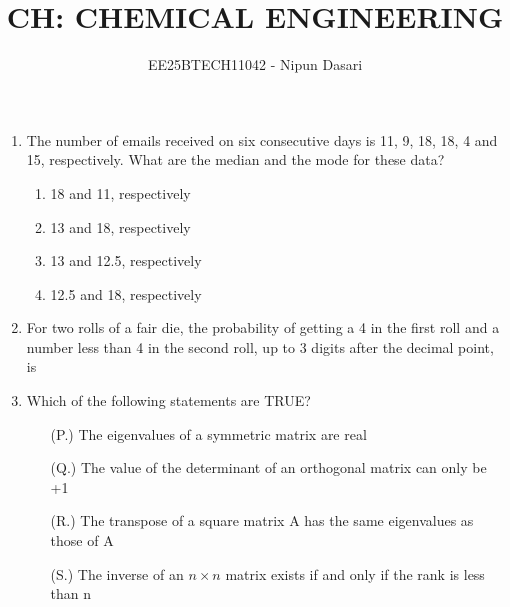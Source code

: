 \documentclass[journal,12pt,onecolumn]{IEEEtran}
\title{CH: CHEMICAL ENGINEERING}
\author{EE25BTECH11042 - Nipun Dasari}
\date{   }
\theoremstyle{remark}
\begin{document}
		
		
		\vspace{3cm}
		
		\maketitle
		

	
	\begin{enumerate}
		\item The number of emails received on six consecutive days is 11, 9, 18, 18, 4 and 15, respectively. 
		What are the median and the mode for these data?
		\begin{enumerate}
			\item  18 and 11, respectively
			\item  13 and 18, respectively
			\item  13 and 12.5, respectively
			\item  12.5 and 18, respectively
		\end{enumerate} 
		
		\item For two rolls of a fair die, the probability of getting a 4 in the first roll and a number less than 4 in 
		the second roll, up to 3 digits after the decimal point, is  \underline{\hspace{2cm}} 
		
		\item Which of the following statements are TRUE?
		\begin{enumerate}
			
			\item[(P.)] The eigenvalues of a symmetric matrix are real
			\item[(Q.)] The value of the determinant of an orthogonal matrix can only be +1
			\item[(R.)] The transpose of a square matrix A has the same eigenvalues as those of A
			\item[(S.)] The inverse of an $n\times n$ matrix exists if and only if the rank is less than n
		

\end{enumerate}
\end{enumerate}
\end{document}
